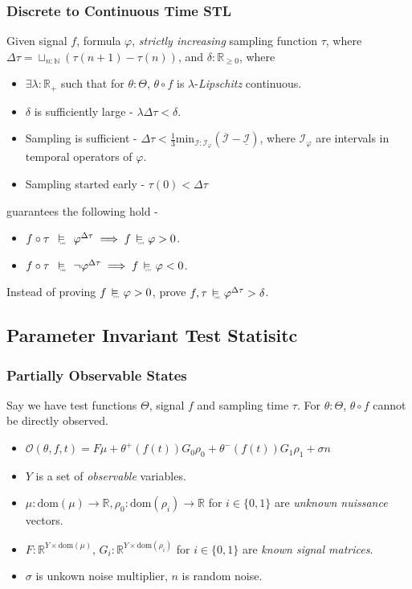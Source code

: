 \documentclass{beamer}
\newcommand{\typeTime}{\mathbb{R}_{\geq 0}}
\newcommand{\typeReal}{\mathbb{R}}
\newcommand{\typeNat}{\mathbb{N}}
\newcommand{\dom}{\text{dom}}
\newcommand{\interval}{\mathcal{I}}
\newcommand{\observe}{\mathcal{O}}
\newcommand{\discrete}{\raisebox{-0.1ex}{\scalebox{0.25}{\textrm{DSC}}}}
\newcommand{\cont}{\raisebox{-0.1ex}{\scalebox{0.25}{\textrm{CNT}}}}
\newcommand{\discreteSatisfy}{\ \stackMath\stackunder[0pt]{\vDash}{\hspace*{0.3em}\discrete}\ }
\newcommand{\contSatisfy}{\ \stackMath\stackunder[0pt]{\vDash}{\hspace*{0.3em}\cont}\ }
\begin{document}
\begin{frame}
    \frametitle{Discrete to Continuous Time STL}
    Given signal $f$, formula $\varphi$, \textit{strictly increasing} sampling function
    $\tau$, where $\Delta \tau = \sqcup_{n : \typeNat}(\tau(n+1) - \tau(n))$,
    and $\delta : \typeTime$, where
    \begin{itemize}
        \item $\exists \lambda:\typeReal_{+}$ such
            that for $\theta : \Theta$, $\theta \circ f$ is
            $\lambda$-\textit{Lipschitz} continuous.
        \item $\delta$ is sufficiently large - $\lambda \Delta\tau < \delta$.
        \item Sampling is sufficient - $\Delta\tau < \frac{1}{3}
            \text{min}_{\interval:\interval_{\varphi}}(\overline{\interval} -
            \underline{\interval})$, where $\interval_{\varphi}$ are intervals
            in temporal operators of $\varphi$.
        \item Sampling started early - $\tau(0) < \Delta\tau$
    \end{itemize}
    \pause
    guarantees the following hold -
    \begin{itemize}
        \item $f \circ \tau\ \discreteSatisfy\ \varphi^{\Delta\tau} \implies f
        \contSatisfy \varphi > 0 $.
        \item $f \circ \tau\ \discreteSatisfy\ \neg\varphi^{\Delta\tau} \implies f
        \contSatisfy \varphi < 0 $.
    \end{itemize}
    Instead of proving $f \contSatisfy \varphi > 0 $, prove
    $f, \tau \discreteSatisfy \varphi^{\Delta\tau} > \delta$.
\end{frame}

\subsection{Parameter Invariant Test Statisitc}

\begin{frame}
    \frametitle{Partially Observable States}
    Say we have test functions $\Theta$, signal $f$
    and sampling time $\tau$. For $\theta : \Theta$, $\theta \circ f$ cannot
    be directly observed.
    \begin{itemize}
        \item $\observe(\theta, f, t) = F\mu + \theta^+(f(t))G_0\rho_0
                + \theta^{-}(f(t))G_1\rho_1 + \sigma n$
        \item $Y$ is a set of \textit{observable} variables.
        \item $\mu : \dom(\mu) \to \typeReal, \rho_0 : \dom(\rho_i) \to
            \typeReal$ for $i \in \{0, 1\}$ are \textit{unknown nuissance} vectors.
        \item $F : \typeReal^{Y \times \dom(\mu)}$,
            $G_i : \typeReal^{Y \times \dom(\rho_i)}$ for $i \in \{0, 1\}$ are
            \textit{known signal matrices}.
        \item $\sigma$ is unkown noise multiplier, $n$ is random noise.
    \end{itemize}
\end{frame}
\end{document}

